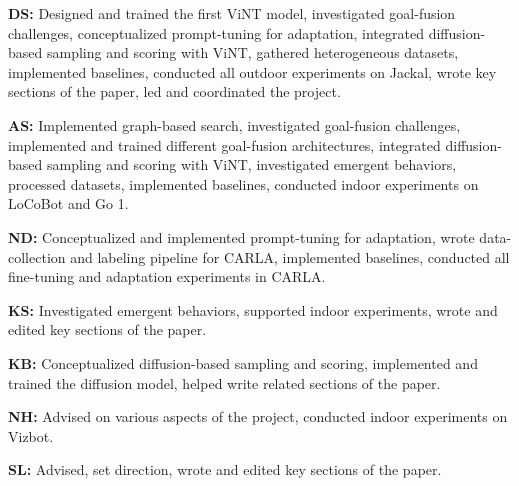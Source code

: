 \documentclass{article}
\newcommand{\ModelName}{ViNT\xspace}
\newcommand{\MyPara}[1]{\noindent\textbf{#1}}
\begin{document}
\MyPara{DS:} Designed and trained the first \ModelName model, investigated goal-fusion challenges, conceptualized prompt-tuning for adaptation, integrated diffusion-based sampling and scoring with \ModelName, gathered heterogeneous datasets, implemented baselines, conducted all outdoor experiments on Jackal, wrote key sections of the paper, led and coordinated the project.

\MyPara{AS:} Implemented graph-based search, investigated goal-fusion challenges, implemented and trained different goal-fusion architectures, integrated diffusion-based sampling and scoring with \ModelName, investigated emergent behaviors, processed datasets, implemented baselines, conducted indoor experiments on LoCoBot and Go 1.

\MyPara{ND:} Conceptualized and implemented prompt-tuning for adaptation, wrote data-collection and labeling pipeline for CARLA, implemented baselines, conducted all fine-tuning and adaptation experiments in CARLA.

\MyPara{KS:} Investigated emergent behaviors, supported indoor experiments, wrote and edited key sections of the paper.

\MyPara{KB:} Conceptualized diffusion-based sampling and scoring, implemented and trained the diffusion model, helped write related sections of the paper.

\MyPara{NH:} Advised on various aspects of the project, conducted indoor experiments on Vizbot.

\MyPara{SL:} Advised, set direction, wrote and edited key sections of the paper.


\clearpage

\end{document}
